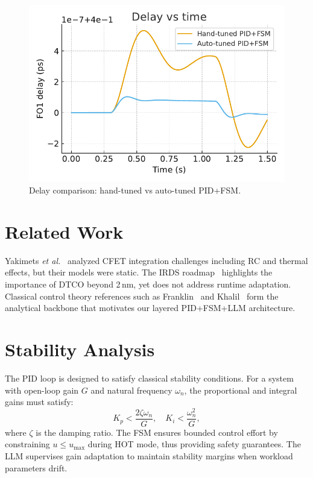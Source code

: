 \documentclass[conference]{IEEEtran}
\begin{document}
\begin{figure}[h]
\centering
\includegraphics[width=0.9\columnwidth]{figs/delay_compare.pdf}
\caption{Delay comparison: hand-tuned vs auto-tuned PID+FSM.}
\label{fig:delay}
\end{figure}

\section{Related Work}
Yakimets \textit{et al.}~\cite{yakimets2020cfet} analyzed CFET
integration challenges including RC and thermal effects,
but their models were static.
The IRDS roadmap~\cite{irds2023} highlights the importance of DTCO
beyond 2\,nm, yet does not address runtime adaptation.
Classical control theory references such as Franklin~\cite{franklin2015}
and Khalil~\cite{khalil2002} form the analytical backbone
that motivates our layered PID+FSM+LLM architecture.

\section{Stability Analysis}
The PID loop is designed to satisfy classical stability conditions.
For a system with open-loop gain $G$ and natural frequency $\omega_n$,
the proportional and integral gains must satisfy:
\begin{equation}
K_p < \frac{2\zeta\omega_n}{G}, \quad
K_i < \frac{\omega_n^2}{G},
\end{equation}
where $\zeta$ is the damping ratio.
The FSM ensures bounded control effort by constraining
$u \leq u_{\max}$ during HOT mode,
thus providing safety guarantees.
The LLM supervises gain adaptation to maintain stability margins
when workload parameters drift.
\end{document}
